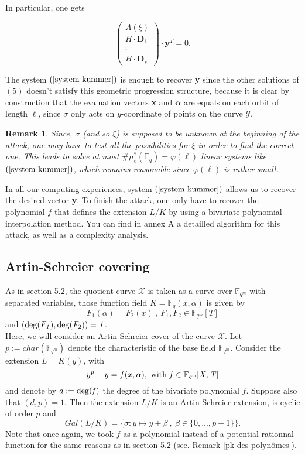 \documentclass[10pt]{article}
\newtheorem{rq1}{Remark}[]
\newcommand{\s}{\vspace{0.3cm}}
\newcommand{\cd}{\cdot}
\newcommand{\fqm}{\mathbb{F}_{q^m}}
\newcommand{\fq}{\mathbb{F}_q}
\newcommand{\X}{\mathcal{X}}
\newcommand{\Y}{\mathcal{Y}}
\begin{document}
In particular, one gets


\begin{equation} \label{system kummer}
\begin{pmatrix}
A(\xi) \\
H \cd \textbf{D}_1 \\
\vdots \\
H \cd \textbf{D}_s
\end{pmatrix}
\cd \textbf{y}^T = 0.
\end{equation}

The system $(\ref{system kummer})$ is enough to recover \textbf{y} since the other solutions of $(5)$ doesn't satisfy this geometric progression structure, because it is clear by construction that the evaluation vectors \textbf{x} and $\boldsymbol{\alpha}$ are equals on each orbit of length $\ell$, since $\sigma$ only acts on $y$-coordinate of points on the curve $\Y$. 

\s

\begin{rq1} \rm
Since, $\sigma$ (and so $\xi$) is supposed to be unknown at the beginning of the attack, one may have to test all the possibilities for $\xi$ in order to find the correct one. This leads to solve at most $\#\mu^*_{\ell}(\fq) = \varphi(\ell)$ linear systems like $(\ref{system kummer})$, which remains reasonable since $\varphi(\ell)$ is rather small.
\end{rq1}

\s

In all our computing experiences, system $(\ref{system kummer})$ allows us to recover the desired vector \textbf{y}. To finish the attack, one only have to recover the polynomial $f$ that defines the extension $L/K$ by using a bivariate polynomial interpolation method. You can find in annex A a detailled algorithm for this attack, as well as a complexity analysis.

\s


\subsection{Artin-Schreier covering}

\s

As in section 5.2, the quotient curve $\X$ is taken as a curve over $\fqm$ with separated variables, those function field $K = \fq(x,\alpha)$ is given by 
\[F_1(\alpha) = F_2(x) \ , \ F_1,F_2 \in \fqm[T]\]
and $(\rm{deg}\it(F_1),\rm{deg}\it(F_{\rm 2}))=1$. \\ 
Here, we will consider an Artin-Schreier cover of the curve $\X$.
Let $p:=char(\fqm)$ denote the characteristic of the base field $\fqm$. Consider the extension $L=K(y)$, with
\[y^p-y = f(x,\alpha) , \ \rm with \it \ f \in \fqm[X,T]\]
and denote by $d:=\rm{deg}\it(f)$ the degree of the bivariate polynomial $f$. Suppose also that $(d,p)=1$. Then the extension $L/K$ is an Artin-Schreier extension, is cyclic of order $p$ and 
\[Gal(L/K) = \{ \sigma : y \mapsto y + \beta \ , \ \beta \in \{0,...,p-1\}\}.\]
Note that once again, we took $f$ as a polynomial instead of a potential rationnal function for the same reasons as in section 5.2 (see. Remark \ref{pk des polynômes}).
\end{document}
